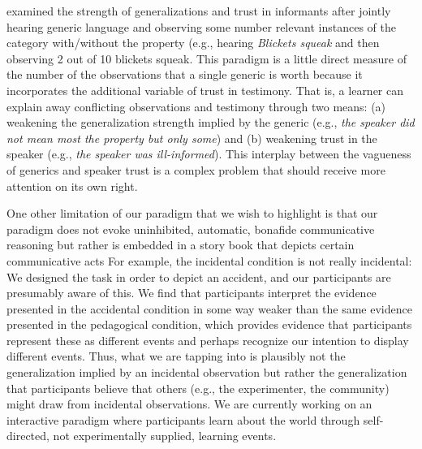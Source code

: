 \documentclass[10pt,letterpaper]{article}
\newcommand{\red}[1]{\textcolor{Red}{#1}}
\begin{document}
 examined the strength of generalizations and trust in informants after jointly hearing generic language and observing some number relevant instances of the category with/without the property (e.g., hearing \emph{Blickets squeak} and then observing 2 out of 10 blickets squeak.
This paradigm is a little direct measure of the number of the observations that a single generic is worth because it incorporates the additional variable of trust in testimony.
That is, a learner can explain away conflicting observations and testimony through two means: (a) weakening the generalization strength implied by the generic (e.g., \emph{the speaker did not mean most the property but only some}) and (b) weakening trust in the speaker (e.g., \emph{the speaker was ill-informed}). 
This interplay between the vagueness of generics and speaker trust is a complex problem that should receive more attention on its own right. 


One other limitation of our paradigm that we wish to highlight is that our paradigm does not evoke uninhibited, automatic, bonafide communicative reasoning but rather is embedded in a story book that depicts certain communicative acts %
For example, the incidental condition is not really incidental: We designed the task in order to depict an accident, and our participants are presumably aware of this. 
We find that participants interpret the evidence presented in the accidental condition in some way weaker than the same evidence presented in the pedagogical condition, which provides evidence that participants represent these as different events and perhaps recognize our intention to display different events. Thus, what we are tapping into is plausibly not the generalization implied by an incidental observation but rather the generalization that participants believe that others (e.g., the experimenter, the community) might draw from incidental observations. 
We are currently working on an interactive paradigm where participants learn about the world through self-directed, not experimentally supplied, learning events. 






\setlength{\bibleftmargin}{.125in}
\setlength{\bibindent}{-\bibleftmargin}


\end{document}
